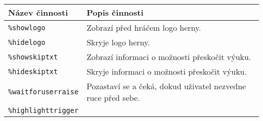 \begin{longtable}[]{@{}ll@{}}
\toprule
\begin{minipage}[b]{0.05\columnwidth}\raggedright\strut
Název činnosti\strut
\end{minipage} & \begin{minipage}[b]{0.05\columnwidth}\raggedright\strut
Popis činnosti\strut
\end{minipage}\tabularnewline
\midrule
\endhead
\begin{minipage}[t]{0.05\columnwidth}\raggedright\strut
\texttt{\%showlogo}\strut
\end{minipage} & \begin{minipage}[t]{0.05\columnwidth}\raggedright\strut
Zobrazí před hráčem logo herny.\strut
\end{minipage}\tabularnewline
\begin{minipage}[t]{0.05\columnwidth}\raggedright\strut
\texttt{\%hidelogo}\strut
\end{minipage} & \begin{minipage}[t]{0.05\columnwidth}\raggedright\strut
Skryje logo herny.\strut
\end{minipage}\tabularnewline
\begin{minipage}[t]{0.05\columnwidth}\raggedright\strut
\texttt{\%showskiptxt}\strut
\end{minipage} & \begin{minipage}[t]{0.05\columnwidth}\raggedright\strut
Zobrazí informaci o možnosti přeskočit výuku.\strut
\end{minipage}\tabularnewline
\begin{minipage}[t]{0.05\columnwidth}\raggedright\strut
\texttt{\%hideskiptxt}\strut
\end{minipage} & \begin{minipage}[t]{0.05\columnwidth}\raggedright\strut
Skryje informaci o možnosti přeskočit výuku.\strut
\end{minipage}\tabularnewline
\begin{minipage}[t]{0.05\columnwidth}\raggedright\strut
\texttt{\%waitforuserraise}\strut
\end{minipage} & \begin{minipage}[t]{0.05\columnwidth}\raggedright\strut
Pozastaví se a čeká, dokud uživatel nezvedne ruce před sebe.\strut
\end{minipage}\tabularnewline
\begin{minipage}[t]{0.05\columnwidth}\raggedright\strut
\texttt{\%highlighttrigger}\strut
\end{minipage} & \begin{minipage}[t]{0.05\columnwidth}\raggedright\strut

\end{minipage}
\end{longtable}
